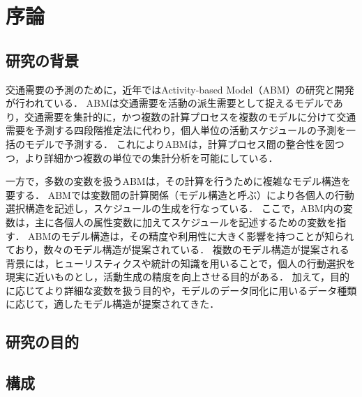 \chapter{序論} 
\label{1}
\section{研究の背景}\label{1.1}
交通需要の予測のために，近年ではActivity-based Model（ABM）の研究と開発が行われている．
ABMは交通需要を活動の派生需要として捉えるモデルであり，交通需要を集計的に，かつ複数の計算プロセスを複数のモデルに分けて交通需要を予測する四段階推定法に代わり，個人単位の活動スケジュールの予測を一括のモデルで予測する．
これによりABMは，計算プロセス間の整合性を図つつ，より詳細かつ複数の単位での集計分析を可能にしている．

一方で，多数の変数を扱うABMは，その計算を行うために複雑なモデル構造を要する．
ABMでは変数間の計算関係（モデル構造と呼ぶ）により各個人の行動選択構造を記述し，スケジュールの生成を行なっている．
ここで，ABM内の変数は，主に各個人の属性変数に加えてスケジュールを記述するための変数を指す．
ABMのモデル構造は，その精度や利用性に大きく影響を持つことが知られており，数々のモデル構造が提案されている．
複数のモデル構造が提案される背景には，ヒューリスティクスや統計の知識を用いることで，個人の行動選択を現実に近いものとし，活動生成の精度を向上させる目的がある．
加えて，目的に応じてより詳細な変数を扱う目的や，モデルのデータ同化に用いるデータ種類に応じて，適したモデル構造が提案されてきた．



\section{研究の目的}\label{1.2}


\section{構成}\label{1.3}
